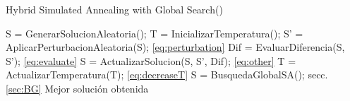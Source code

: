 \begin{algorithm}[!ht]
  \caption{Hybrid Simulated Annealing with Global Search(\mbox{})}
  \label{pseu:sa}
  \begin{algorithmic}[1]
    \STATE S = GenerarSolucionAleatoria();
    \STATE T = InicializarTemperatura(); 
        \STATE S' = AplicarPerturbacionAleatoria(S); \ref{eq:perturbation}
        \STATE Dif = EvaluarDiferencia(S, S'); \ref{eq:evaluate} 
        \STATE S = ActualizarSolucion(S, S', Dif);  \ref{eq:other}
        \STATE T = ActualizarTemperatura(T); \ref{eq:decreaseT}
        \STATE S = BusquedaGlobalSA(); secc. \ref{sec:BG}
    \ENDWHILE
    \RETURN Mejor solución obtenida
  \end{algorithmic}
\end{algorithm}